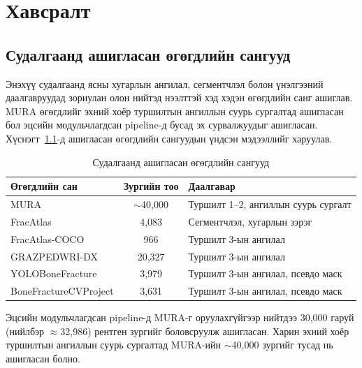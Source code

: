 
\chapter{Хавсралт}
\label{Appendix}
\pagecolor{white}

\section{Судалгаанд ашигласан өгөгдлийн сангууд}

Энэхүү судалгаанд ясны хугарлын ангилал, сегментчлэл болон үнэлгээний даалгавруудад зориулан олон нийтэд нээлттэй хэд хэдэн өгөгдлийн санг ашиглав. MURA өгөгдлийг эхний хоёр туршилтын ангиллын суурь сургалтад ашигласан бол эцсийн модульчлагдсан pipeline-д бусад эх сурвалжуудыг ашигласан. Хүснэгт~\ref{tab:appA_datasets}-д ашигласан өгөгдлийн сангуудын үндсэн мэдээллийг харуулав.

\begin{table}[ht]
    \centering
    \begin{tabular}{|l|c|l|}
    \hline
    \textbf{Өгөгдлийн сан} & \textbf{Зургийн тоо} & \textbf{Даалгавар} \\ \hline
    MURA                  & $\sim$40{,}000 & Туршилт 1--2, ангиллын суурь сургалт \\ \hline
    FracAtlas             & 4{,}083  & Сегментчлэл, хугарлын зэрэг \\ \hline
    FracAtlas-COCO        & 966      & Туршилт 3-ын ангилал \\ \hline
    GRAZPEDWRI-DX         & 20{,}327 & Туршилт 3-ын ангилал \\ \hline
    YOLOBoneFracture      & 3{,}979  & Туршилт 3-ын ангилал, псевдо маск \\ \hline
    BoneFractureCVProject & 3{,}631  & Туршилт 3-ын ангилал, псевдо маск \\ \hline
    \end{tabular}
    \caption{Судалгаанд ашигласан өгөгдлийн сангууд}
    \label{tab:appA_datasets}
\end{table}

Эцсийн модульчлагдсан pipeline-д MURA-г оруулахгүйгээр нийтдээ 30{,}000 гаруй (нийлбэр $\approx$32{,}986) рентген зургийг боловсруулж ашигласан. Харин эхний хоёр туршилтын ангиллын суурь сургалтад MURA-ийн $\sim$40{,}000 зургийг тусад нь ашигласан болно.

